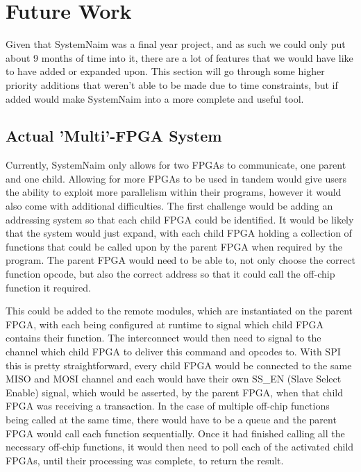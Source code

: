\chapter{Future Work}

Given that SystemNaim was a final year project, and as such we could only put about 9 months of time into it, there are a lot of features that we would have like to have added or expanded upon. This section will go through some higher priority additions that weren't able to be made due to time constraints, but if added would make SystemNaim into a more complete and useful tool.

\section{Actual 'Multi'-FPGA System}

Currently, SystemNaim only allows for two FPGAs to communicate, one parent and one child. Allowing for more FPGAs to be used in tandem would give users the ability to exploit more parallelism within their programs, however it would also come with additional difficulties. The first challenge would be adding an addressing system so that each child FPGA could be identified. It would be likely that the system would just expand, with each child FPGA holding a collection of functions that could be called upon by the parent FPGA when required by the program. The parent FPGA would need to be able to, not only choose the correct function opcode, but also the correct address so that it could call the off-chip function it required. 

This could be added to the remote modules, which are instantiated on the parent FPGA, with each being configured at runtime to signal which child FPGA contains their function. The interconnect would then need to signal to the channel which child FPGA to deliver this command and opcodes to. With SPI this is pretty straightforward, every child FPGA would be connected to the same MISO and MOSI channel and  each would have their own SS\_EN (Slave Select Enable) signal, which would be asserted, by the parent FPGA, when that child FPGA was receiving a transaction. In the case of multiple off-chip functions being called at the same time, there would have to be a queue and the parent FPGA would call each function sequentially. Once it had finished calling all the necessary off-chip functions, it would then need to poll each of the activated child FPGAs, until their processing was complete, to return the result.

